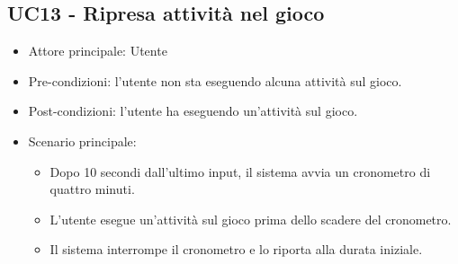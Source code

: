 \subsection{UC13 - Ripresa attività nel gioco}
\begin{itemize}
    \item Attore principale: Utente
    \item Pre-condizioni: l'utente non sta eseguendo alcuna attività sul gioco.
    \item Post-condizioni: l'utente ha eseguendo un'attività sul gioco.
    \item Scenario principale: \begin{itemize}
        \item Dopo 10 secondi dall'ultimo input, il sistema avvia un cronometro di quattro minuti.
        \item L'utente esegue un'attività sul gioco prima dello scadere del cronometro.
        \item Il sistema interrompe il cronometro e lo riporta alla durata iniziale.
    \end{itemize}
\end{itemize}
\newpage
